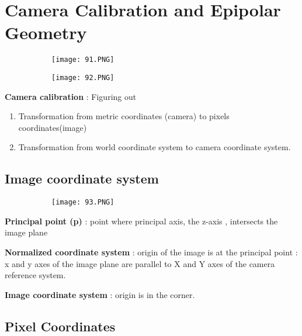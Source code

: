 \documentclass{article}
\begin{document}
\vspace{50mm}

\section{Camera Calibration and Epipolar Geometry}

\begin{figure}[ht!]
  \centering
  \begin{subfigure}[b]{0.4\linewidth}
    \texttt{[image: 91.PNG]}
  \end{subfigure}
  \begin{subfigure}[b]{0.4\textwidth}
         \centering
         \texttt{[image: 92.PNG]}
     \end{subfigure}
\end{figure}

\textbf{Camera calibration} : Figuring out 
\begin{enumerate}
    \item Transformation from metric coordinates (camera) to pixels coordinates(image)
    \item Transformation from world coordinate system to camera coordinate system.
\end{enumerate}

\subsection{Image coordinate system}

\begin{figure}[ht!]
  \centering
  \begin{subfigure}[b]{0.4\linewidth}
    \texttt{[image: 93.PNG]}
  \end{subfigure}
\end{figure}

\textbf{Principal point (p)} : point where principal axis, the z-axis , intersects the image plane

\textbf{Normalized coordinate system } : origin of the image is at the principal point : x and y axes of the image plane are parallel to X and Y axes of the camera reference system.

\textbf{Image coordinate system} : origin is in the corner.

\subsection{Pixel Coordinates}
\end{document}
